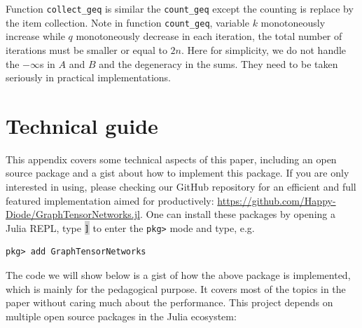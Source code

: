 \documentclass[onefignum, onetabnum]{siamart190516}
\newcommand{\<}{\langle}
\renewcommand{\>}{\rangle}
\begin{document}
Function \texttt{collect\_geq} is similar the \texttt{count\_geq} except the counting is replace by the item collection.
Note in function \texttt{count\_geq}, variable $k$ monotoneously increase while $q$ monotoneously decrease in each iteration,
the total number of iterations must be smaller or equal to $2n$.
Here for simplicity, we do not handle the $-\infty$s in $A$ and $B$ and the degeneracy in the sums.
They need to be taken seriously in practical implementations.

\section{Technical guide}\label{sec:technical}

This appendix covers some technical aspects of this paper, including an open source package and a gist about how to implement this package. If you are only interested in using, please checking our GitHub repository for an efficient and full featured implementation aimed for productively:
\href{https://github.com/Happy-Diode/GraphTensorNetworks.jl}{https://github.com/Happy-Diode/GraphTensorNetworks.jl}.
One can install these packages by opening a Julia REPL, type \colorbox{lightgray}{\texttt{]}} to enter the \texttt{pkg>} mode and type, e.g.
\begin{lstlisting}
pkg> add GraphTensorNetworks
\end{lstlisting}

The code we will show below is a gist of how the above package is implemented, which is mainly for the pedagogical purpose.
It covers most of the topics in the paper without caring much about the performance.
This project depends on multiple open source packages in the Julia ecosystem:
\end{document}
